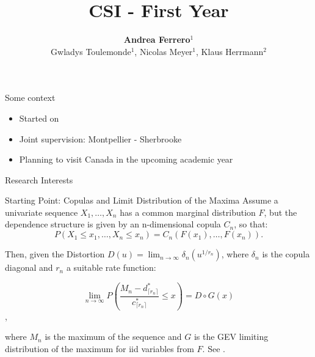 \documentclass[10pt, aspectratio=169]{beamer}
\title{CSI - First Year}
\author{
  \textbf{Andrea Ferrero}$^{1}$\\[0.2cm]
  \small Gwladys Toulemonde$^{1}$, Nicolas Meyer$^{1}$, Klaus Herrmann$^{2}$
}
\institute{
  $^{1}$ \textit{University of Montpellier, Lemon Team Inria} \\
  $^{2}$ \textit{University of Sherbrooke}
}
\date{}
\begin{document}
\maketitle

\begin{frame}{Some context}
  \begin{itemize}
    \item Started on 
    \item Joint supervision: Montpellier - Sherbrooke
    \item Planning to visit Canada in the upcoming academic year
  \end{itemize}
\end{frame}

\begin{frame}{Research Interests}

\centering
{}

\end{frame}

\begin{frame}{Starting Point: Copulas and Limit Distribution of the Maxima}
  Assume a univariate sequence $X_1, \dots , X_n$ has a common marginal distribution $F$, but the \alert{dependence} structure is given by an n-dimensional copula $C_n$, so that:
  \[
  P(X_1 \leq x_1, \dots, X_n \leq x_n) = C_n(F(x_1), \dots, F(x_n)).
  \] \pause

  Then, given the \alert{Distortion} $D(u) = \lim_{n \to \infty} \delta_n(u^{1/r_n})$, where $\delta_n$ is the copula \alert{diagonal} and $r_n$ a suitable rate function: \pause

  \[
  \lim_{n \to \infty} P \left(\frac{M_n - d^*_{\lceil{r_n}\rceil}}{c^*_{\lceil{r_n}\rceil}} \leq x \right) = D \circ G(x)
  \],

  where $M_n$ is the maximum of the sequence and $G$ is the GEV limiting distribution of the maximum for iid variables from $F$. See \parencite{herrmann2024}.
\end{frame}
\end{document}
